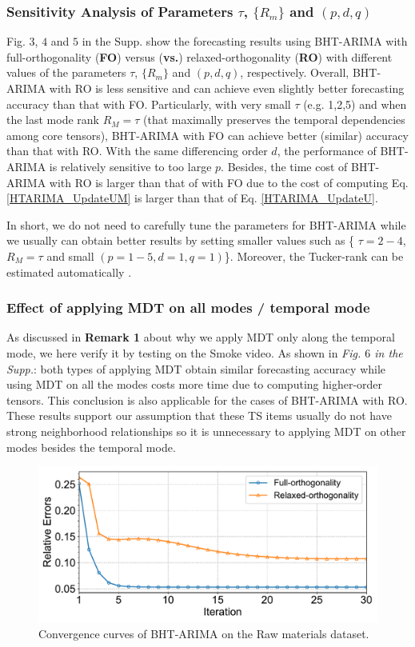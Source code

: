 \documentclass[letterpaper]{article} %
\numberwithin{theorem}{section}
\begin{document}
\subsubsection {Sensitivity Analysis of Parameters $\tau$, $\{R_m\}$ and  $(p,d,q)$}
Fig. $3$, $4$ and $5$ in the  Supp. show the forecasting results  using  BHT-ARIMA with  {full-orthogonality (\textbf{FO}) }  versus (\textbf{vs.})  {relaxed-orthogonality (\textbf{RO})}  with   different values of the  parameters  $\tau$, $\{R_m\}$ and  $(p,d,q)$, respectively.  Overall,   BHT-ARIMA with  RO is less sensitive and can achieve even slightly better forecasting accuracy than that  with FO.  Particularly, with   very small  $\tau$  (e.g. 1,2,5) and  when  the last mode rank $R_M =\tau $ (that maximally preserves the temporal dependencies among  core tensors),  BHT-ARIMA with  FO can achieve better  (similar) accuracy than that with RO.  With the same differencing  order $d$, the performance of BHT-ARIMA is relatively sensitive to too large $p$. Besides, the time cost of  BHT-ARIMA with RO is larger than   that of with FO  due to the cost of computing Eq.  \eqref{HTARIMA_UpdateUM} is larger than that of Eq.  \eqref{HTARIMA_UpdateU}.

In short,    we do not need to carefully tune the parameters for BHT-ARIMA  while we usually  can obtain better results by  setting  smaller values such as  \{ $\tau = {2-4}$,   $R_M =\tau $ and small  $(p={1-5}, d={1},q={1})$\}.   Moreover,  the Tucker-rank can be estimated automatically \cite{yokota2016robust,shi2017tensor}.

\subsubsection {Effect of  applying MDT on all modes /  temporal mode}
As discussed in \textbf{Remark 1} about why we apply MDT only along the temporal mode,  we here  verify it by testing on the Smoke video. As shown in  \textit{Fig. $6$ in the Supp.}: both types of applying MDT obtain similar forecasting accuracy while   using MDT on all the modes costs more time due to computing higher-order tensors.   This conclusion is also  applicable for the cases of  BHT-ARIMA with RO. These results support our assumption that  these TS items usually do not have strong neighborhood relationships   so it is unnecessary to applying MDT on other modes besides the temporal  mode.
\begin{figure} [ttt!]
	\centering
\includegraphics[width=0.85\columnwidth]{Fig3_Convergence_curves.pdf}
\caption{\label{Convergence}Convergence curves  of BHT-ARIMA on   the Raw materials dataset.}
\end{figure}
\end{document}
